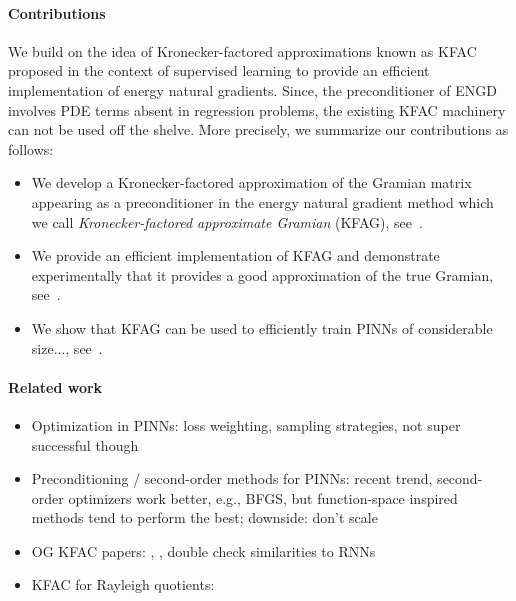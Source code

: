 \paragraph{Contributions} 
We build on the idea of Kronecker-factored approximations known as KFAC proposed in the context of supervised learning to provide an efficient implementation of energy natural gradients. 
Since, the preconditioner of ENGD involves PDE terms absent in regression problems, the existing KFAC machinery can not be used off the shelve. 
More precisely, we summarize our contributions as follows: 
\begin{itemize}
    \item We develop a Kronecker-factored approximation of the Gramian matrix appearing as a preconditioner in the energy natural gradient method which we call \emph{Kronecker-factored approximate Gramian} (KFAG), see~.
    \item We provide an efficient implementation of KFAG and demonstrate experimentally that it provides a good approximation of the true Gramian, see~. 
    \item We show that KFAG can be used to efficiently train PINNs of considerable size..., see~. 
\end{itemize}

\paragraph{Related work}
\begin{itemize}
    \item Optimization in PINNs: loss weighting, sampling strategies, not super successful though
    \item Preconditioning / second-order methods for PINNs: recent trend, second-order optimizers work better, e.g., BFGS, but function-space inspired methods tend to perform the best; downside: don't scale 
    \item OG KFAC papers: \cite{martens2015optimizing}, \cite{martens2018kroneckerfactored}, double check similarities to RNNs
    \item KFAC for Rayleigh quotients:
\end{itemize}

